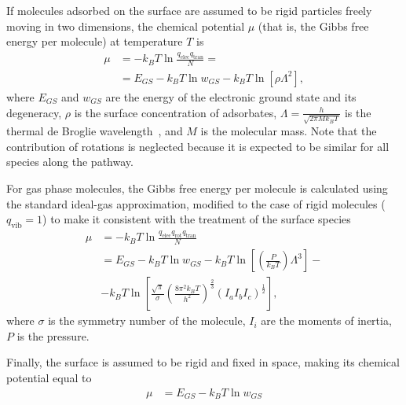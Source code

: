 \documentclass[journal=jpclcd,layout=traditional,manuscript=letter]{achemso} %
\begin{document}
If molecules adsorbed on the surface are assumed to be rigid particles freely moving in two dimensions, the chemical potential $\mu$ (that is, the Gibbs free energy per molecule) at temperature $T$ is
%
\begin{equation}
\begin{split}
\mu &= - k_B T \ln{\frac{  q_{\text{elec}}q_{\text{tran}}  }{N}} = \\
&=  E_{GS} - k_BT\ln{w_{GS}} - k_BT\ln \left[ \rho \Lambda^2  \right],
\end{split}
\end{equation}
%
where $E_{GS}$ and $w_{GS}$ are the energy of the electronic ground state and its degeneracy, $\rho$ is the surface concentration of adsorbates, $\Lambda = \frac{h}{\sqrt{2\pi M k_BT}}$ is the thermal de Broglie wavelength~\cite{ullmann_172}, and $M$ is the molecular mass. Note that the contribution of rotations is neglected because it is expected to be similar for all species along the pathway.

For gas phase molecules, the Gibbs free energy per molecule is calculated using the standard ideal-gas approximation, modified to the case of rigid molecules ($q_{\text{vib}}=1$) to make it consistent with the treatment of the surface species
%
\begin{equation}
\begin{split}
\mu &= -k_B T \ln{\frac{q_{\text{elec}}q_{\text{rot}}q_{\text{tran}}}{N}} \\
&=  E_{GS} - k_BT\ln{w_{GS}} - k_BT\ln{\left[ \left( \frac{P}{k_BT} \right) \Lambda^3  \right]} -\\
& - k_BT\ln{\left[\frac{\sqrt{\pi}}{\sigma} \left(\frac{8\pi^2k_BT}{h^2} \right)^{\frac{2}{3}}(I_aI_bI_c)^{\frac{1}{2}} \right]},
\end{split}
\end{equation}
%
where $\sigma$ is the symmetry number of the molecule, $I_{i}$ are the moments of inertia, $P$ is the pressure.

Finally, the surface is assumed to be rigid and fixed in space, making its chemical potential equal to
%
\begin{equation}
\begin{split}
\mu &= E_{GS} - k_BT \ln{w_{GS}}
\end{split}
\end{equation}
%
\end{document}
